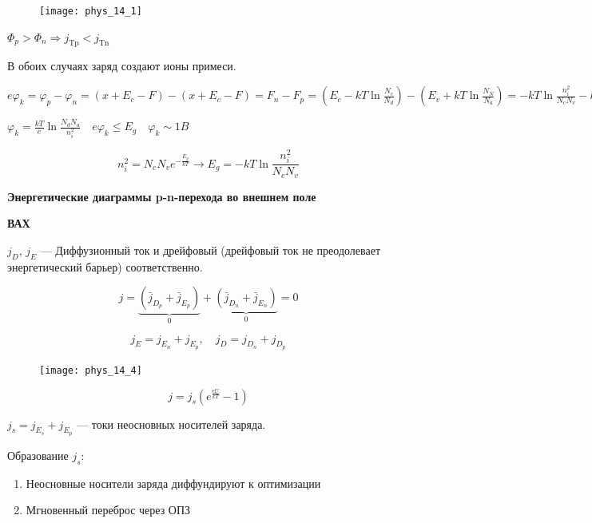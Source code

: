 \begin{figure}[h!]
    \centering
    \texttt{[image: phys\_14\_1]}
\end{figure}

$\Phi_p > \Phi_n \Rightarrow j_\text{Tp}<j_\text{Tn}$

В обоих случаях заряд создают ионы примеси.

$\displaystyle e \varphi_k=\varphi_p-\varphi_n=\left(x+E_c-F\right)-\left(x+E_c-F\right)=F_n-F_p= \left(E_c-k T \ln \frac{N_c}{N_d}\right)-\left(E_v+k T \ln \frac{N_N}{N_a}\right)=-k T \ln \frac{n_i^2}{N_c N_v} -k T \ln \frac{N_c}{N_d}-k T \ln \frac{N_v}{N_a}=k T \ln \frac{N_c N_v}{n_i^2} \cdot \frac{N_d}{N_c} \cdot \frac{N_a}{N_v}= k T \ln \frac{N_d N_a}{n_i^2}$


$\displaystyle \varphi_k=\frac{k T}{e} \ln \frac{N_d N_a}{n_i^2} \quad e \varphi_k \leq E_g \quad \varphi_k \sim 1 B$

$$
n_i^2=N_c N_v e^{-\frac{E_g}{k T}} \rightarrow E_g=-k T \ln \frac{n_i^2}{N_c N_v}
$$


\textbf{Энергетические диаграммы p-n-перехода во внешнем поле}

\begin{figure}[h!]
    \centering
\end{figure}

\textbf{ВАХ}

$j_D$, $j_E$ --- Диффузионный ток и дрейфовый (дрейфовый ток не преодолевает энергетический барьер) соответственно.

$$
j=\underbrace{\left(\bar{j}_{D_p}+\bar{j}_{E_p}\right)}_0 + \underbrace{\left(\bar{j}_{D_n}+\bar{j}_{E_n}\right)}_0=0
$$

$$
j_E=j_{E_n}+j_{E_p}, \quad j_D=j_{D_n}+j_{D_p}
$$

\begin{figure}[h!]
    \centering
    \texttt{[image: phys\_14\_4]}
\end{figure}

$$
j=j_s\left(e^{\frac{eU}{k T}}-1\right)
$$

$j_s=j_{E_s}+j_{E_p}$ --- токи неосновных носителей заряда.

Образование $j_s$:

\begin{enumerate}
    \item Неосновные носители заряда диффундируют к оптимизации
    \item Мгновенный переброс через ОПЗ
\end{enumerate}

